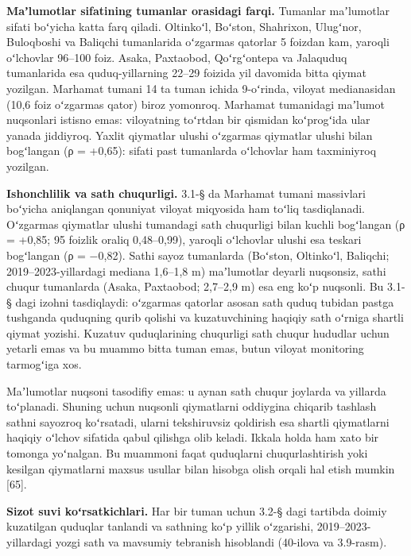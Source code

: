 \textbf{Maʼlumotlar sifatining tumanlar orasidagi farqi.} Tumanlar
maʼlumotlar sifati boʻyicha katta farq qiladi. Oltinkoʻl, Boʻston,
Shahrixon, Ulugʻnor, Buloqboshi va Baliqchi tumanlarida oʻzgarmas
qatorlar 5 foizdan kam, yaroqli oʻlchovlar 96--100 foiz. Asaka,
Paxtaobod, Qoʻrgʻontepa va Jalaquduq tumanlarida esa quduq-yillarning
22--29 foizida yil davomida bitta qiymat yozilgan. Marhamat tumani 14 ta
tuman ichida 9-oʻrinda, viloyat medianasidan (10,6 foiz oʻzgarmas qator)
biroz yomonroq. Marhamat tumanidagi maʼlumot nuqsonlari istisno emas:
viloyatning toʻrtdan bir qismidan koʻprogʻida ular yanada jiddiyroq.
Yaxlit qiymatlar ulushi oʻzgarmas qiymatlar ulushi bilan bogʻlangan (ρ =
+0,65): sifati past tumanlarda oʻlchovlar ham taxminiyroq yozilgan.

\textbf{Ishonchlilik va sath chuqurligi.} 3.1-§ da Marhamat tumani
massivlari boʻyicha aniqlangan qonuniyat viloyat miqyosida ham toʻliq
tasdiqlanadi. Oʻzgarmas qiymatlar ulushi tumandagi sath chuqurligi bilan
kuchli bogʻlangan (ρ = +0,85; 95 foizlik oraliq 0,48--0,99), yaroqli
oʻlchovlar ulushi esa teskari bogʻlangan (ρ = −0,82). Sathi sayoz
tumanlarda (Boʻston, Oltinkoʻl, Baliqchi; 2019--2023-yillardagi mediana
1,6--1,8 m) maʼlumotlar deyarli nuqsonsiz, sathi chuqur tumanlarda
(Asaka, Paxtaobod; 2,7--2,9 m) esa eng koʻp nuqsonli. Bu 3.1-§ dagi
izohni tasdiqlaydi: oʻzgarmas qatorlar asosan sath quduq tubidan pastga
tushganda quduqning qurib qolishi va kuzatuvchining haqiqiy sath oʻrniga
shartli qiymat yozishi. Kuzatuv quduqlarining chuqurligi sath chuqur
hududlar uchun yetarli emas va bu muammo bitta tuman emas, butun viloyat
monitoring tarmogʻiga xos.

Maʼlumotlar nuqsoni tasodifiy emas: u aynan sath chuqur joylarda va
yillarda toʻplanadi. Shuning uchun nuqsonli qiymatlarni oddiygina
chiqarib tashlash sathni sayozroq koʻrsatadi, ularni tekshiruvsiz
qoldirish esa shartli qiymatlarni haqiqiy oʻlchov sifatida qabul
qilishga olib keladi. Ikkala holda ham xato bir tomonga yoʻnalgan. Bu
muammoni faqat quduqlarni chuqurlashtirish yoki kesilgan qiymatlarni
maxsus usullar bilan hisobga olish orqali hal etish mumkin {[}65{]}.

\textbf{Sizot suvi koʻrsatkichlari.} Har bir tuman uchun 3.2-§ dagi
tartibda doimiy kuzatilgan quduqlar tanlandi va sathning koʻp yillik
oʻzgarishi, 2019--2023-yillardagi yozgi sath va mavsumiy tebranish
hisoblandi (40-ilova va 3.9-rasm).



